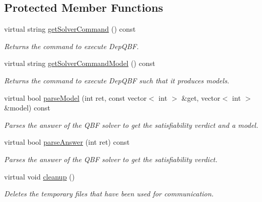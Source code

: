 \subsection*{Protected Member Functions}
\begin{DoxyCompactItemize}
\item 
virtual string \hyperlink{classDepQBFExt_a64f0c17958bd64cfd20a1f2478f68077}{get\-Solver\-Command} () const 
\begin{DoxyCompactList}\small\item\em Returns the command to execute Dep\-Q\-B\-F. \end{DoxyCompactList}\item 
virtual string \hyperlink{classDepQBFExt_a72321fcf85a52333c0f7e83004a3f119}{get\-Solver\-Command\-Model} () const 
\begin{DoxyCompactList}\small\item\em Returns the command to execute Dep\-Q\-B\-F such that it produces models. \end{DoxyCompactList}\item 
virtual bool \hyperlink{classDepQBFExt_a9dd5f30054b19543393c43796ac43016}{parse\-Model} (int ret, const vector$<$ int $>$ \&get, vector$<$ int $>$ \&model) const 
\begin{DoxyCompactList}\small\item\em Parses the answer of the Q\-B\-F solver to get the satisfiability verdict and a model. \end{DoxyCompactList}\item 
virtual bool \hyperlink{classExtQBFSolver_a11ddbf3980824453238071e8a036f804}{parse\-Answer} (int ret) const 
\begin{DoxyCompactList}\small\item\em Parses the answer of the Q\-B\-F solver to get the satisfiability verdict. \end{DoxyCompactList}\item 
virtual void \hyperlink{classExtQBFSolver_a3ee48837c5e937e4d3a5b3c2a6b761d3}{cleanup} ()
\begin{DoxyCompactList}\small\item\em Deletes the temporary files that have been used for communication. \end{DoxyCompactList}\end{DoxyCompactItemize}
